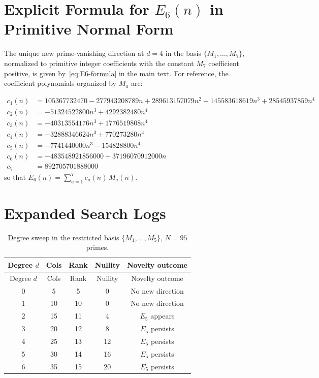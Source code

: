 \documentclass[11pt]{article}
\begin{document}
\section{Explicit Formula for $E_6(n)$ in Primitive Normal Form}
\label{app:E6-formula}

The unique new prime-vanishing direction at $d=4$ in the basis $\{M_1,\dots,M_7\}$,
normalized to primitive integer coefficients with the constant $M_7$ coefficient positive,
is given by~\eqref{eq:E6-formula} in the main text.
For reference, the coefficient polynomials organized by $M_a$ are:

\begin{align*}
c_1(n)&=105367732470-277943208789n+289613157079n^2-145583618619n^3+28545937859n^4\\
c_2(n)&=-51324522800n^3+4292382480n^4\\
c_3(n)&=-40313554176n^3+1776519808n^4\\
c_4(n)&=-32888346624n^3+770273280n^4\\
c_5(n)&=-7741440000n^3-154828800n^4\\
c_6(n)&=-483548921856000+37196070912000n\\
c_7&=892705701888000
\end{align*}
so that $E_6(n)=\sum_{a=1}^{7}c_a(n)\,M_a(n)$.

\section{Expanded Search Logs}
\label{app:placeholder-tables}

\begin{longtable}{@{}ccccc@{}}
\caption{Degree sweep in the restricted basis $\{M_1,\dots,M_5\}$, $N=95$ primes.}
\label{tab:expanded-m1-m5}\\
\toprule
Degree $d$ & Cols & Rank & Nullity & Novelty outcome \\
\midrule
\endfirsthead
\toprule
Degree $d$ & Cols & Rank & Nullity & Novelty outcome \\
\midrule
\endhead
0 & 5  & 5  & 0  & No new direction \\
1 & 10 & 10 & 0  & No new direction \\
2 & 15 & 11 & 4  & $E_5$ appears \\
3 & 20 & 12 & 8  & $E_5$ persists \\
4 & 25 & 13 & 12 & $E_5$ persists \\
5 & 30 & 14 & 16 & $E_5$ persists \\
6 & 35 & 15 & 20 & $E_5$ persists \\
\bottomrule
\end{longtable}
\end{document}
